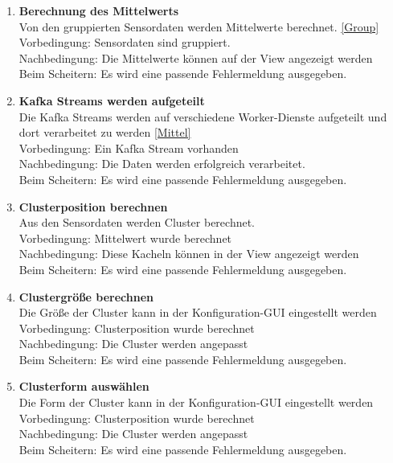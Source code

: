\begin{enumerate}[label=\textbf{PF\arabic{enumi}0}]
	\item \textbf{Berechnung des Mittelwerts}\label{Mittel}\\
		Von den gruppierten Sensordaten werden Mittelwerte berechnet. \ref{Group}\\ 
		Vorbedingung: Sensordaten sind gruppiert.\\ 
		Nachbedingung: Die Mittelwerte können auf der View angezeigt werden \\ 
		Beim Scheitern: Es wird eine passende Fehlermeldung ausgegeben.	
	
		
	\item \textbf{Kafka Streams werden aufgeteilt }\\
		Die Kafka Streams werden auf verschiedene Worker-Dienste aufgeteilt und dort verarbeitet zu werden \ref{Mittel} \\
		Vorbedingung: Ein Kafka Stream vorhanden\\
		Nachbedingung: Die Daten werden erfolgreich verarbeitet. \\ 
		Beim Scheitern: Es wird eine passende Fehlermeldung ausgegeben. 
	
	\item \textbf{Clusterposition berechnen } \label{Kachel}\\
		Aus den Sensordaten werden Cluster berechnet. \\
		Vorbedingung: Mittelwert wurde berechnet\\
		Nachbedingung: Diese Kacheln können in der View angezeigt werden \\ 
		Beim Scheitern: Es wird eine passende Fehlermeldung ausgegeben. 
		
	\item \textbf{Clustergröße berechnen } \\
		Die Größe der Cluster kann in der Konfiguration-GUI eingestellt werden \\
		Vorbedingung: Clusterposition wurde berechnet\\
		Nachbedingung: Die Cluster werden angepasst \\ 
		Beim Scheitern: Es wird eine passende Fehlermeldung ausgegeben. 
		
	\item \textbf{Clusterform auswählen  } \\
		Die Form der Cluster kann in der Konfiguration-GUI eingestellt werden \\
			Vorbedingung: Clusterposition wurde berechnet\\
		Nachbedingung: Die Cluster werden angepasst \\ 
		Beim Scheitern: Es wird eine passende Fehlermeldung ausgegeben.
	

\end{enumerate}

